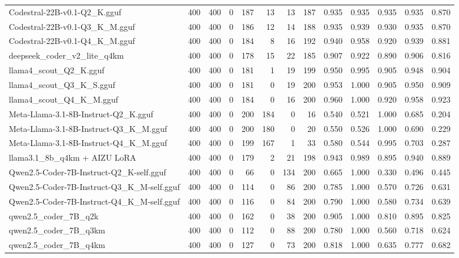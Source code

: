 \begin{table}[htbp]
{\begin{tabular}{lrrrrrrrrrrrr}
    Codestral-22B-v0.1-Q2\_K.gguf & 400 & 400 & 0 & 187 & 13 & 13 & 187 & 0.935 & 0.935 & 0.935 & 0.935 & 0.870 \\
    Codestral-22B-v0.1-Q3\_K\_M.gguf & 400 & 400 & 0 & 186 & 12 & 14 & 188 & 0.935 & 0.939 & 0.930 & 0.935 & 0.870 \\
    Codestral-22B-v0.1-Q4\_K\_M.gguf & 400 & 400 & 0 & 184 & 8 & 16 & 192 & 0.940 & 0.958 & 0.920 & 0.939 & 0.881 \\
    deepseek\_coder\_v2\_lite\_q4km & 400 & 400 & 0 & 178 & 15 & 22 & 185 & 0.907 & 0.922 & 0.890 & 0.906 & 0.816 \\
    llama4\_scout\_Q2\_K.gguf & 400 & 400 & 0 & 181 & 1 & 19 & 199 & 0.950 & 0.995 & 0.905 & 0.948 & 0.904 \\
    llama4\_scout\_Q3\_K\_S.gguf & 400 & 400 & 0 & 181 & 0 & 19 & 200 & 0.953 & 1.000 & 0.905 & 0.950 & 0.909 \\
    llama4\_scout\_Q4\_K\_M.gguf & 400 & 400 & 0 & 184 & 0 & 16 & 200 & 0.960 & 1.000 & 0.920 & 0.958 & 0.923 \\
    Meta-Llama-3.1-8B-Instruct-Q2\_K.gguf & 400 & 400 & 0 & 200 & 184 & 0 & 16 & 0.540 & 0.521 & 1.000 & 0.685 & 0.204 \\
    Meta-Llama-3.1-8B-Instruct-Q3\_K\_M.gguf & 400 & 400 & 0 & 200 & 180 & 0 & 20 & 0.550 & 0.526 & 1.000 & 0.690 & 0.229 \\
    Meta-Llama-3.1-8B-Instruct-Q4\_K\_M.gguf & 400 & 400 & 0 & 199 & 167 & 1 & 33 & 0.580 & 0.544 & 0.995 & 0.703 & 0.287 \\
    llama3.1\_8b\_q4km + AIZU LoRA & 400 & 400 & 0 & 179 & 2 & 21 & 198 & 0.943 & 0.989 & 0.895 & 0.940 & 0.889 \\
    Qwen2.5-Coder-7B-Instruct-Q2\_K-self.gguf & 400 & 400 & 0 & 66 & 0 & 134 & 200 & 0.665 & 1.000 & 0.330 & 0.496 & 0.445 \\
    Qwen2.5-Coder-7B-Instruct-Q3\_K\_M-self.gguf & 400 & 400 & 0 & 114 & 0 & 86 & 200 & 0.785 & 1.000 & 0.570 & 0.726 & 0.631 \\
    Qwen2.5-Coder-7B-Instruct-Q4\_K\_M-self.gguf & 400 & 400 & 0 & 116 & 0 & 84 & 200 & 0.790 & 1.000 & 0.580 & 0.734 & 0.639 \\
    qwen2.5\_coder\_7B\_q2k & 400 & 400 & 0 & 162 & 0 & 38 & 200 & 0.905 & 1.000 & 0.810 & 0.895 & 0.825 \\
    qwen2.5\_coder\_7B\_q3km & 400 & 400 & 0 & 112 & 0 & 88 & 200 & 0.780 & 1.000 & 0.560 & 0.718 & 0.624 \\
    qwen2.5\_coder\_7B\_q4km & 400 & 400 & 0 & 127 & 0 & 73 & 200 & 0.818 & 1.000 & 0.635 & 0.777 & 0.682 \\

\end{tabular}}
\end{table}
